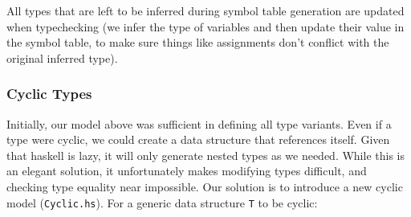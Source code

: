 \documentclass[11pt]{article}
\begin{document}
All types that are left to be inferred during symbol table generation
are updated when typechecking (we infer the type of variables and then
update their value in the symbol table, to make sure things like
assignments don't conflict with the original inferred type).

\subsubsection{Cyclic Types}

Initially, our model above was sufficient in defining all type variants.
Even if a type were cyclic, we could create a data structure that references itself.
Given that haskell is lazy, it will only generate nested types as we needed.
While this is an elegant solution, it unfortunately makes modifying types difficult, and checking type equality near impossible.
Our solution is to introduce a new cyclic model (\texttt{Cyclic.hs}).
For a generic data structure \texttt{T} to be cyclic:
\end{document}
